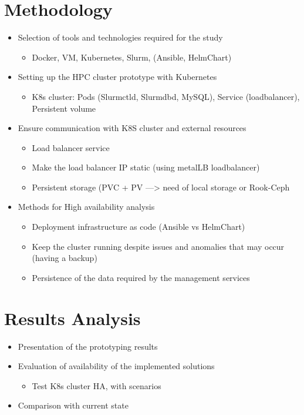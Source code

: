 \documentclass{article}
\begin{document}
\section{Methodology}
\begin{itemize}
    \item Selection of tools and technologies required for the study
        \begin{itemize}
            \item Docker, VM, Kubernetes, Slurm, (Ansible, HelmChart)
        \end{itemize}
    \item Setting up the HPC cluster prototype with Kubernetes
        \begin{itemize}
            \item K8s cluster: Pods (Slurmctld, Slurmdbd, MySQL), Service (loadbalancer), Persistent volume
        \end{itemize}
    \item Ensure communication with K8S cluster and external resources
        \begin{itemize}
            \item Load balancer service
            \item Make the load balancer IP static (using metalLB loadbalancer) 
            \item Persistent storage (PVC + PV ---> need of local storage or Rook-Ceph 
        \end{itemize}
    \item Methods for High availability analysis
        \begin{itemize}
            \item Deployment infrastructure as code (Ansible vs HelmChart)
            \item Keep the cluster running despite issues and anomalies that may occur (having a backup)
            \item Persistence of the data required by the management services
            
            
        \end{itemize}
\end{itemize}

\section{Results Analysis}
\begin{itemize}
    \item Presentation of the prototyping results
    \item Evaluation of availability of the implemented solutions
        \begin{itemize}
            \item Test K8s cluster HA, with scenarios 
        \end{itemize}
    \item Comparison with current state

\end{itemize}
\end{document}
